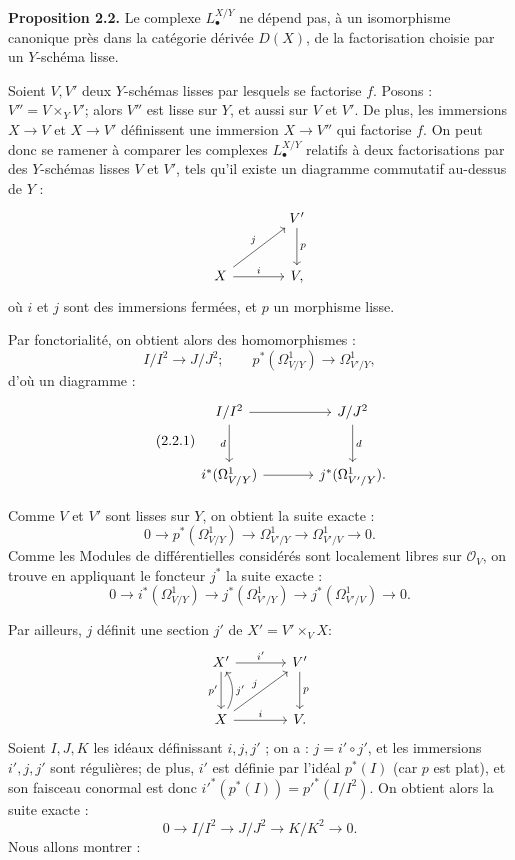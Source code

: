 \documentclass[11pt]{article}
\begin{document}
\textbf{Proposition 2.2.} Le complexe $L^{X/Y}_\bullet$ ne dépend pas, à un isomorphisme canonique près dans la catégorie dérivée $D(X)$, de la factorisation choisie par un $Y$-schéma lisse.

Soient $V,V'$ deux $Y$-schémas lisses par lesquels se factorise $f$. Posons : $V''=V\times_Y V'$; alors $V''$ est lisse sur $Y$, et aussi sur $V$ et $V'$. De plus, les immersions $X\to V$ et $X\to V'$ définissent une immersion $X\to V''$ qui factorise $f$. On peut donc se ramener à comparer les complexes $L^{X/Y}_\bullet$ relatifs à deux factorisations par des $Y$-schémas lisses $V$ et $V'$, tels qu'il existe un diagramme commutatif au-dessus de $Y$ :
\[
\begin{tikzcd}[column sep=large,row sep=large]
& V' \arrow[d,"p"]\\
X \arrow[ur,"j"] \arrow[r,"i"] & V,
\end{tikzcd}
\]
où $i$ et $j$ sont des immersions fermées, et $p$ un morphisme lisse.

Par fonctorialité, on obtient alors des homomorphismes :
\[
I/I^2\longrightarrow J/J^2;
\qquad
p^*(\Omega^1_{V/Y})\longrightarrow\Omega^1_{V'/Y},
\]
d'où un diagramme :
\begin{equation}\tag{2.2.1}
\begin{tikzcd}[column sep=large,row sep=large]
I/I^2 \arrow[r] \arrow[d,"d"'] & J/J^2 \arrow[d,"d"]\\
i^*(\Omega^1_{V/Y}) \arrow[r] & j^*(\Omega^1_{V'/Y}).
\end{tikzcd}
\end{equation}

Comme $V$ et $V'$ sont lisses sur $Y$, on obtient la suite exacte :
\[
0\longrightarrow p^*(\Omega^1_{V/Y})\longrightarrow\Omega^1_{V'/Y}
\longrightarrow\Omega^1_{V'/V}\longrightarrow0.
\]
Comme les Modules de différentielles considérés sont localement libres sur $\mathcal O_V$, on trouve en appliquant le foncteur $j^*$ la suite exacte :
\begin{equation}\tag{2.2.2}
0\longrightarrow i^*(\Omega^1_{V/Y})\longrightarrow j^*(\Omega^1_{V'/Y})
\longrightarrow j^*(\Omega^1_{V'/V})\longrightarrow0.
\end{equation}

Par
ailleurs, $j$ définit une section $j'$ de $X'=V'\times_V X$:
\[
\begin{tikzcd}[column sep=large,row sep=large]
X' \arrow[r,"i'"] \arrow[d,"p'"'] & V' \arrow[d,"p"]\\
X \arrow[r,"i"] \arrow[ur,"j"] \arrow[u,"j'"',bend right] & V .
\end{tikzcd}
\]
Soient $I,J,K$ les idéaux définissant $i,j,j'$ ; on a : $j=i'\circ j'$, et les immersions $i',j,j'$ sont régulières; de plus, $i'$ est définie par l'idéal $p^*(I)$ (car $p$ est plat), et son faisceau conormal est donc $i'^*(p^*(I))=p'^*(I/I^2)$. On obtient alors la suite exacte :
\begin{equation}\tag{2.2.3}
0\longrightarrow I/I^2\longrightarrow J/J^2\longrightarrow K/K^2\longrightarrow0.
\end{equation}
Nous allons montrer :
\end{document}
